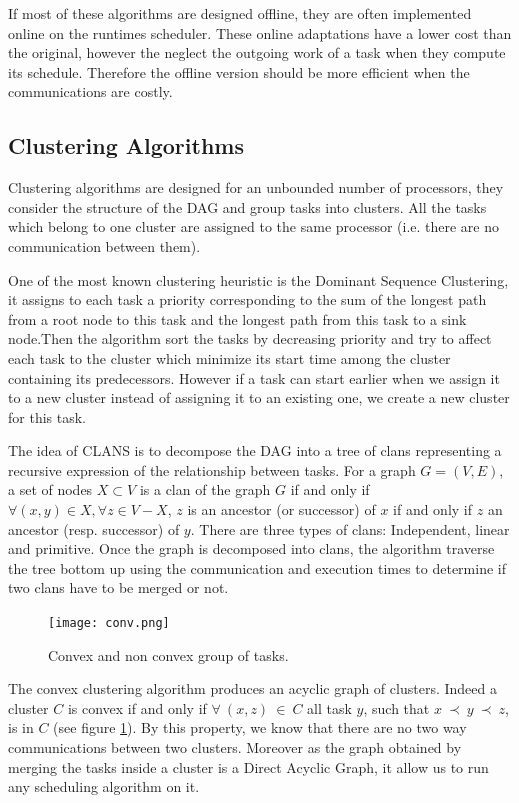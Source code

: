\documentclass[10pt, conference, compsocconf,pdftex,dvipsnames]{IEEEtran}
\begin{document}
If most of these algorithms are designed offline, they are often implemented
online on the runtimes scheduler. These online adaptations have a lower cost
than the original, however the neglect the outgoing work of a task when they
compute its schedule. Therefore the offline version should be more efficient
when the communications are costly.

\subsection{Clustering Algorithms}

Clustering algorithms are designed for an unbounded number of processors, they
consider the structure of the DAG and group tasks into clusters. All the
tasks which belong to one cluster are assigned to the same processor (i.e. 
there are no communication between them).  

One of the most known clustering heuristic is the Dominant Sequence
Clustering\cite{yang1994dsc}, it assigns to each task a priority corresponding
to the sum of the longest path from a root node to this task and the longest
path from this task to a sink node.Then the algorithm sort the tasks by
decreasing priority and try to affect each task to the cluster which minimize
its start time among the cluster containing its predecessors. However if a
task can start earlier when we assign it to a new cluster instead of assigning
it to an existing one, we create a new cluster for this task.

The idea of CLANS
\cite{aubum1990efficient,mccreary1993partitioning,mccreary1993graph} is to
decompose the DAG into a tree of clans representing a recursive expression of
the relationship between tasks. For a graph $G=(V,E)$, a set of nodes
$X\subset V$ is a clan of the graph $G$ if and only if $\forall (x,y) \in X,
\forall z \in V-X$, $z$ is an ancestor (or successor) of $x$ if and only if
$z$ an ancestor (resp. successor) of $y$. There are three types of clans:
Independent, linear and primitive. Once the graph is decomposed into clans,
the algorithm traverse the tree bottom up using the communication and
execution times to determine if two clans have to be merged or not.

\begin{figure}[htb]
    \centering
    \texttt{[image: conv.png]}
    \caption{Convex and non convex group of tasks.}
    \label{fig:conv}
\end{figure}


The convex clustering algorithm\cite{lepere2002new} produces an acyclic graph
of clusters.  Indeed a cluster $C$ is convex if and only if $\forall\ (x,z)\
\in\ C$ all task $y$, such that $x\ \prec\ y\ \prec\ z$, is in $C$ (see
figure \ref{fig:conv}). By this property, we know that there are no two way
communications between two clusters. Moreover as the graph obtained by merging
the tasks inside a cluster is a Direct Acyclic Graph, it allow us to run
any scheduling algorithm on it.
\end{document}

